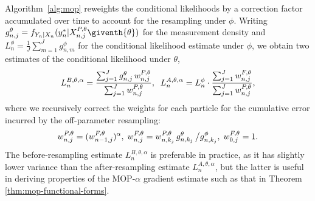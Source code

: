 \documentclass[9pt,twocolumn,pnasresearcharticle]{pnas-new}
\newcommand\arxiv[2]{#2} %
\begin{document}
Algorithm~\ref{alg:mop} reweights the conditional likelihoods by a correction factor accumulated over time to account for the resampling under $\phi$. 
Writing $g^{\theta}_{n,j}={f}_{{Y}_{n}|{X}_{n}}(y_{n}^{*}|{X}_{n,j}^{P,\theta}\giventh{\theta})$ for the measurement density and $L_n^{\phi} = \frac{1}{J}\sum_{m=1}^{J}g^{\phi}_{n,m}$ for the conditional likelihood estimate under $\phi$, we obtain two estimates of the conditional likelihood under $\theta$,
\arxiv{}{\vspace*{-1.5mm}}
\begin{equation}
     \label{eq:mop-conditional-likelihood}
     L_n^{B,\theta,\alpha} = \frac{\sum_{j=1}^Jg^\theta_{n,j}\, w^{P,\theta}_{n,j}}{\sum_{j=1}^J  w^{P,\theta}_{n,j}}, \arxiv{\hspace{15mm}}{\;\;}
     L_n^{A,\theta,\alpha} = L_n^\phi\cdot \frac{\sum_{j=1}^J w^{F,\theta}_{n,j}}{\sum_{j=1}^J  w^{P,\theta}_{n,j}},
     \arxiv{}{\vspace*{-1.5mm}}
\end{equation}
where we recursively correct the weights for each particle for the cumulative error incurred by the off-parameter resampling:
\arxiv{}{\vspace*{-1.5mm}}
\begin{equation}
    \label{eq:weighting-scheme}
    w_{n,j}^{P,\theta} = (w_{n-1,j}^{F,\theta})^\alpha, 
    \arxiv{\hspace{5mm}}{\;}
    w^{F,\theta}_{n,j} = w^{P,\theta}_{n,k_j} \, g^{\theta}_{n,k_j} \, \big/ g^{\phi}_{n,k_j}, 
    \arxiv{\hspace{5mm}}{\;}
    w^{F,\theta}_{0,j}= 1.
    \arxiv{}{\vspace*{-1.5mm}}
\end{equation}
The before-resampling estimate $L_n^{B,\theta,\alpha}$ is preferable in practice, as it has slightly lower variance than the after-resampling estimate $L_n^{A,\theta,\alpha}$, but the latter is useful in deriving properties of the MOP-$\alpha$ gradient estimate such as that in Theorem \ref{thm:mop-functional-forms}.

\end{document}

